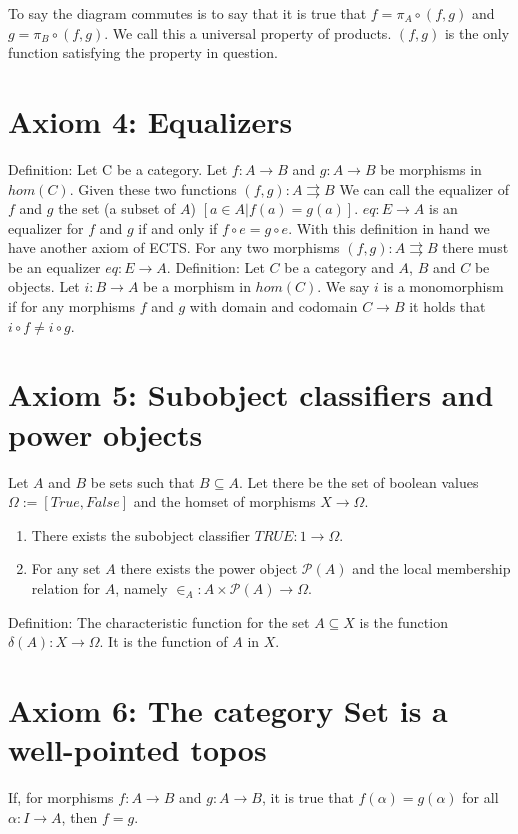 \documentclass[a4paper, 12pt]{article}
\begin{document}
\noindent To say the diagram commutes is to say that it is true that $f = \pi_{A} \circ (f,g)$ and $g = \pi_{B} \circ (f,g)$. We call this a universal property of products. $(f,g)$ is the only function satisfying the property in question.

\section*{Axiom 4: Equalizers}
Definition:
Let C be a category. Let $f: A \longrightarrow B$ and $g: A \longrightarrow B$ be morphisms in $hom(C)$. Given these two functions $(f,g): A \rightrightarrows B$ We can call the equalizer of $f$ and $g$ the set (a subset of $A$) $[a \in A | f(a) = g(a)]$. $eq: E \longrightarrow A$ is an equalizer for $f$ and $g$ if and only if $f \circ e = g \circ e$.
With this definition in hand we have another axiom of ECTS. For any two morphisms $(f,g): A \rightrightarrows B$ there must be an equalizer $eq: E \longrightarrow A$. Definition: Let $C$ be a category and $A$, $B$ and $C$ be objects. Let $i: B \longrightarrow A$ be a morphism in $hom(C)$. We say $i$ is a monomorphism if for any morphisms $f$ and $g$ with domain and codomain $C \longrightarrow B$ it holds that $i \circ f \neq i \circ g$. 

\section*{Axiom 5: Subobject classifiers and power objects}
Let $A$ and $B$ be sets such that $B \subseteq A$. Let there be the set of boolean values $\Omega := [True,False]$ and the homset of morphisms $X \longrightarrow \Omega$.
\begin{enumerate}
  \item There exists the subobject classifier $TRUE: 1 \longrightarrow \Omega$.
  \item For any set $A$ there exists the power object $\mathcal{P}(A)$ and the local membership relation for $A$, namely $\in_{A} : A \times \mathcal{P}(A) \longrightarrow \Omega$.
\end{enumerate}
Definition: The characteristic function for the set $A \subseteq X$ is the function $\delta (A): X \longrightarrow \Omega$. It is the function of $A$ in $X$.

\section*{Axiom 6: The category Set is a well-pointed topos}
If, for morphisms $f: A \longrightarrow B$ and $g: A \longrightarrow B$, it is true that $f(\alpha) = g(\alpha)$ for all $\alpha : I \longrightarrow A$, then $f=g$.
\end{document}

